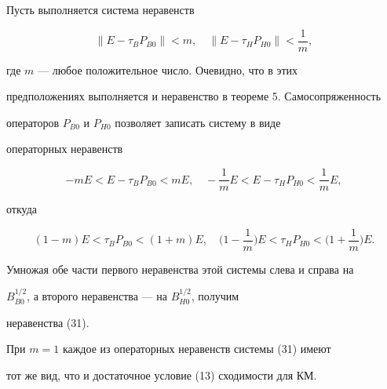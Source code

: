 \begin{pf} 


Пусть выполняется система неравенств 


$$ 


\|E-\tau_B P_{B0}\|<m,\quad 


\|E-\tau_H P_{H0}\|<\frac{1}{m}, 


$$ 


где $m$ --- любое положительное число. Очевидно, что в этих 


предположениях выполняется и неравенство в теореме 5. Самосопряженность 


операторов $P_{B0}$ и $P_{H0}$ позволяет записать систему в виде 


операторных неравенств 


$$ 


-m E<E-\tau_B P_{B0}<m E,\quad 


-\frac{1}{m}E<E-\tau_H P_{H0}<\frac{1}{m}E, 


$$ 


откуда 


$$ 


(1-m)E<\tau_B P_{B0}<(1+m)E,\quad 


\bigg(1-\frac{1}{m} \bigg)E<\tau_H P_{H0}< 


\bigg(1+\frac{1}{m} \bigg)E. 


$$ 


Умножая обе части первого неравенства этой системы слева и справа на 


$B^{1/2}_{B0}$, а второго неравенства --- на $B^{1/2}_{H0}$, получим 


неравенства (31). 


\end{pf} 


 


\begin{notenonum} 


При $m=1$ каждое из операторных неравенств системы (31) имеют 


тот же вид, что и достаточное условие (13) сходимости для КМ. 


\end{notenonum} 


 


